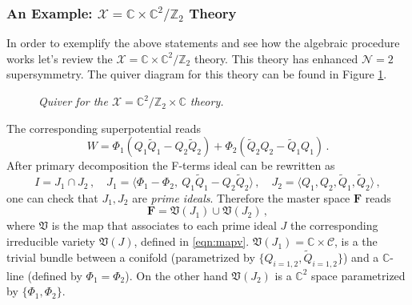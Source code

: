 \documentclass[main.tex]{subfiles}
\begin{document}
\subsubsection{An Example: $\mathcal{X}=\mathbb{C}\times\mathbb{C}^2/\mathbb{Z}_2$ Theory}\label{sec:N2example}
In order to exemplify the above statements and see how the algebraic procedure works let's review the $\mathcal{X}=\mathbb{C}\times\mathbb{C}^2/\mathbb{Z}_2 $ theory. This theory has enhanced $\mathcal{N}=2$ supersymmetry. The quiver diagram for this theory can be found in Figure \ref{fig:example}.
\begin{figure}
\caption{\textit{Quiver for the $\mathcal{X}=\mathbb{C}^2/\mathbb{Z}_2 \times \mathbb{C}$ theory.} \label{fig:example}}
\end{figure}
The corresponding superpotential reads
\begin{equation}
W = \Phi_1(Q_1\widetilde{Q}_1-Q_2\widetilde{Q}_2)+\Phi_2(\widetilde{Q}_2Q_2-\widetilde{Q}_1Q_1)\,. 
\end{equation}
After primary decomposition the F-terms ideal can be rewritten as
\begin{equation}
I=J_1 \cap J_2\,,\quad J_1= \langle \Phi_1-\Phi_2, \ Q_1\widetilde{Q}_1-Q_2\widetilde{Q}_2 \rangle \,,\quad J_2= \langle Q_1,Q_2,\widetilde{Q}_1,\widetilde{Q}_2 \rangle \, ,
\end{equation}
one can check that $J_1,J_2$ are \textit{prime ideals}. Therefore the master space $\mathbf{F}$ reads
\begin{equation}
\mathbf{F} = \mathfrak{V}(J_1) \cup \mathfrak{V}(J_2)\,, 
\end{equation}
where $\mathfrak{V}$ is the map that associates to each prime ideal $J$ the corresponding irreducible variety $\mathfrak{V}(J)$, defined in \eqref{eqn:mapv}. $\mathfrak{V}(J_1)=\mathbb{C}   \times   \mathcal{C}$,  is a the trivial bundle between a conifold (parametrized by $\{Q_{i=1,2},\widetilde{Q}_{i=1,2}\}$) and a $\mathbb{C}$-line (defined by $\Phi_1=\Phi_2$). On the other hand $\mathfrak{V}(J_2)$ is a $\mathbb{C}^2$ space parametrized by $\{\Phi_1,\Phi_2\}$.
\end{document}
